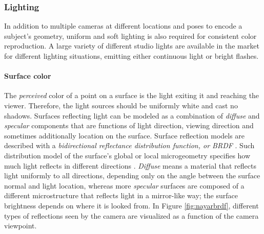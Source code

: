 
\subsubsection{Lighting} \label{sec:bg-lighting} %

In addition to multiple cameras at different locations and poses to encode a subject's geometry, uniform and soft lighting is also required for consistent color reproduction.
A large variety of different studio lights are available in the market for different lighting situations, emitting either continuous light or bright flashes.


\paragraph{Surface color}
The \emph{perceived} color of a point on a surface is the light exiting it and reaching the viewer.
Therefore, the light sources should be uniformly white and cast no shadows.
Surfaces reflecting light can be modeled as a combination of \emph{diffuse} and \emph{specular} components that are functions of light direction, viewing direction and sometimes additionally location on the surface.
Surface reflection models are described with a \emph{bidirectional reflectance distribution function, or BRDF} \cite{nicodemus1965directional}.
Such distribution model of the surface's global or local microgeometry specifies how much light reflects in different directions \cite{nayar1991surface}.
\emph{Diffuse} means a material that reflects light uniformly to all directions, depending only on the angle between the surface normal and light location, whereas more \emph{specular} surfaces are composed of a different microstructure that reflects light in a mirror-like way; the surface brightness depends on where it is looked from.
In Figure \ref{fig:nayarbrdf}, different types of reflections seen by the camera are visualized as a function of the camera viewpoint.


